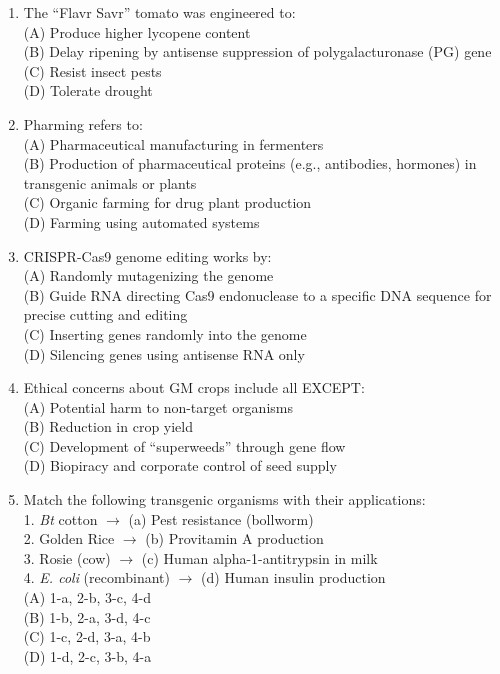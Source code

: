 \documentclass{article}
\begin{document}
\begin{enumerate}[label=Q\arabic*.]
\item The ``Flavr Savr'' tomato was engineered to:
\\(A) Produce higher lycopene content
\\(B) Delay ripening by antisense suppression of polygalacturonase (PG) gene
\\(C) Resist insect pests
\\(D) Tolerate drought

\item Pharming refers to:
\\(A) Pharmaceutical manufacturing in fermenters
\\(B) Production of pharmaceutical proteins (e.g., antibodies, hormones) in transgenic animals or plants
\\(C) Organic farming for drug plant production
\\(D) Farming using automated systems

\item CRISPR-Cas9 genome editing works by:
\\(A) Randomly mutagenizing the genome
\\(B) Guide RNA directing Cas9 endonuclease to a specific DNA sequence for precise cutting and editing
\\(C) Inserting genes randomly into the genome
\\(D) Silencing genes using antisense RNA only

\item Ethical concerns about GM crops include all EXCEPT:
\\(A) Potential harm to non-target organisms
\\(B) Reduction in crop yield
\\(C) Development of ``superweeds'' through gene flow
\\(D) Biopiracy and corporate control of seed supply

\item Match the following transgenic organisms with their applications:\\
1. \textit{Bt} cotton $\rightarrow$ (a) Pest resistance (bollworm)\\
2. Golden Rice $\rightarrow$ (b) Provitamin A production\\
3. Rosie (cow) $\rightarrow$ (c) Human alpha-1-antitrypsin in milk\\
4. \textit{E. coli} (recombinant) $\rightarrow$ (d) Human insulin production
\\(A) 1-a, 2-b, 3-c, 4-d
\\(B) 1-b, 2-a, 3-d, 4-c
\\(C) 1-c, 2-d, 3-a, 4-b
\\(D) 1-d, 2-c, 3-b, 4-a


\end{enumerate}
\end{document}

